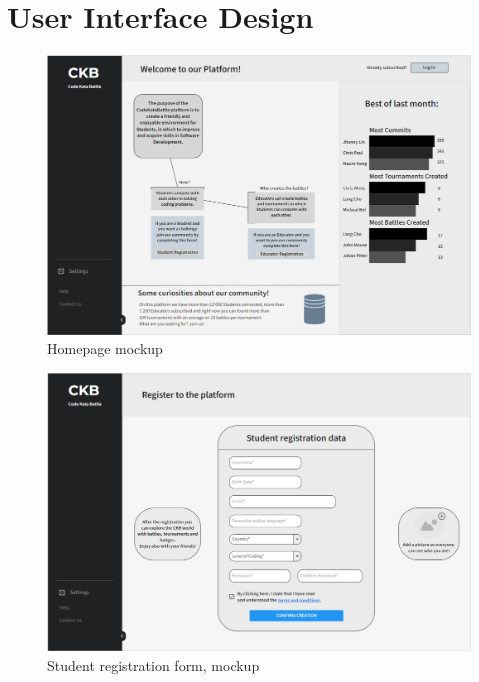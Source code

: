 \documentclass{article}
\begin{document}
{\newpage
\pagestyle{UserInterfaceStyle}
\section{User Interface Design}
\begin{figure}[H]
    \centering
    \hspace*{-2.5cm}\includegraphics[scale=0.7]{UserInterface/Homepage.png}
    \caption{Homepage mockup}
    \label{fig:homepageMockup}
\end{figure}
\begin{figure}[H]
    \centering
    \hspace*{-0.2cm}\includegraphics[scale=0.52]{UserInterface/StudentRegistration.png}
    \caption{Student registration form, mockup}
    \label{fig:studentRegistrationFormMockup}
\end{figure}
\begin{figure}[H]
    \centering

\end{figure}}
\end{document}
